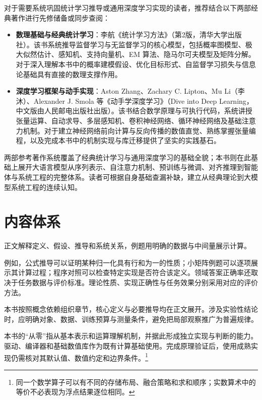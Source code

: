 对于需要系统巩固统计学习推导或通用深度学习实现的读者，推荐结合以下两部经典著作进行先修储备或同步查阅：
\begin{itemize}
  \item \textbf{数理基础与经典统计学习}：李航《统计学习方法》（第2版，清华大学出版社）。该书系统推导监督学习与无监督学习的核心模型，包括概率图模型、极大似然估计、感知机、支持向量机、EM 算法、隐马尔可夫模型及矩阵分解。对于深入理解本书中的概率建模假设、优化目标形式、自监督学习损失与信息论基础具有直接的数理支撑作用。
  \item \textbf{深度学习框架与动手实现}：Aston Zhang、Zachary C. Lipton、Mu Li（李沐）、Alexander J. Smola 等《动手学深度学习》（Dive into Deep Learning，中文版由人民邮电出版社出版）。该书结合数学原理与可执行代码，系统讲授张量运算、自动求导、多层感知机、卷积神经网络、循环神经网络及基础注意力机制。对于建立神经网络前向计算与反向传播的数值直觉、熟练掌握张量编程，以及完成本书中的机制实现与库迁移提供了坚实的实践基石。
\end{itemize}

两部参考著作系统覆盖了经典统计学习与通用深度学习的基础全貌；本书则在此基础上展开大语言模型从序列表示、自注意力机制、预训练与微调、对齐推理到智能体与系统工程的完整体系。读者可根据自身基础查漏补缺，建立从经典理论到大模型系统工程的连续认知。

\section*{内容体系}
正文解释定义、假设、推导和系统关系，例题用明确的数据与中间量展示计算。

例如，公式推导可以证明某种归一化具有行和为一的性质；小矩阵例题可以逐项展示其计算过程；程序对照可以检查特定实现是否符合该定义。领域答案正确率还取决于任务数据与评价标准。理论性质、实现正确性与任务效果分别采用对应的评价方法。

本书按照概念依赖组织章节，核心定义与必要推导均在正文展开。涉及实验性结论时，应明确对象、数据、训练预算与测量条件，避免把局部观察推广为普遍规律。

本书的“从零”指从基本表示和运算理解机制，并据此形成独立实现与判断的能力。驱动、编译器和基础数值库作为既有计算基础使用。完成原理验证后，使用成熟实现仍需核对其默认值、数值约定和边界条件。\footnote{同一个数学算子可以有不同的存储布局、融合策略和求和顺序；实数算术中的等价不必表现为浮点结果逐位相同。}
